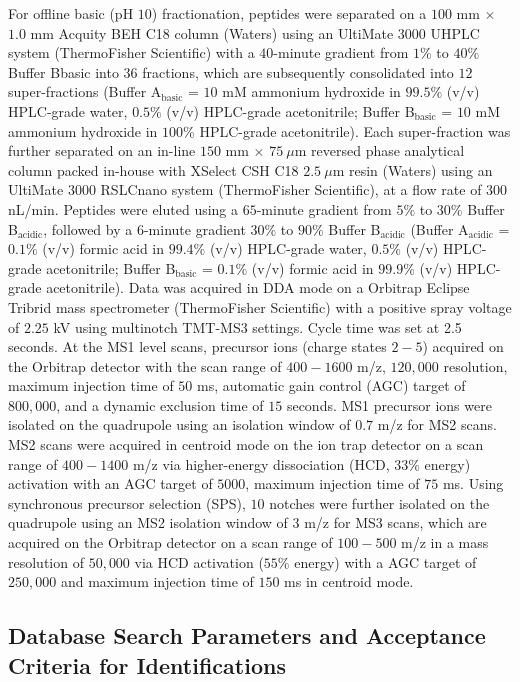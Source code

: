\documentclass[journal=jprobs,manuscript=article]{achemso}
\begin{document}
For offline basic (pH $10$) fractionation, peptides were separated on a $100$ mm $\times$ $1.0$ mm Acquity BEH C18 column (Waters) using an UltiMate $3000$ UHPLC system (ThermoFisher Scientific) with a $40$-minute gradient from $1\%$ to $40\%$ Buffer Bbasic into $36$ fractions, which are subsequently consolidated into $12$ super-fractions (Buffer A$_{\text{basic}}$ = $10$ mM ammonium hydroxide in $99.5\%$ (v/v) HPLC-grade water, $0.5\%$ (v/v) HPLC-grade acetonitrile; Buffer B$_{\text{basic}}$ = $10$ mM ammonium hydroxide in $100\%$ HPLC-grade acetonitrile). Each super-fraction was further separated on an in-line $150$ mm $\times$ $75 \ \mu$m reversed phase analytical column packed in-house with XSelect CSH C18 $2.5\ \mu$m resin (Waters) using an UltiMate $3000$ RSLCnano system (ThermoFisher Scientific), at a flow rate of $300$ nL/min. Peptides were eluted using a $65$-minute gradient from $5\%$ to $30\%$ Buffer B$_{\text{acidic}}$, followed by a $6$-minute gradient $30\%$ to $90\%$ Buffer B$_{\text{acidic}}$ (Buffer A$_{\text{acidic}}$ = $0.1\%$ (v/v) formic acid in $99.4\%$ (v/v) HPLC-grade water, $0.5\%$ (v/v) HPLC-grade acetonitrile; Buffer B$_{\text{basic}}$ = $0.1\%$ (v/v) formic acid in $99.9\%$ (v/v) HPLC-grade acetonitrile). Data was acquired in DDA mode on a Orbitrap Eclipse Tribrid mass spectrometer (ThermoFisher Scientific) with a positive spray voltage of $2.25$ kV using multinotch TMT-MS3 settings\cite{mcalister2014multinotch}. Cycle time was set at 2.5 seconds. At the MS1 level scans, precursor ions (charge states $2-5$) acquired on the Orbitrap detector with the scan range of $400-1600$ m/z, $120{,}000$ resolution, maximum injection time of $50$ ms, automatic gain control (AGC) target of $800{,}000$, and a dynamic exclusion time of $15$ seconds. MS1 precursor ions were isolated on the quadrupole using an isolation window of $0.7$ m/z for MS2 scans. MS2 scans were acquired in centroid mode on the ion trap detector on a scan range of $400-1400$ m/z via higher-energy dissociation (HCD, $33\%$ energy) activation with an AGC target of $5000$, maximum injection time of $75$ ms. Using synchronous precursor selection (SPS)\cite{mcalister2014multinotch}, $10$ notches were further isolated on the quadrupole using an MS2 isolation window of $3$ m/z for MS3 scans, which are acquired on the Orbitrap detector on a scan range of $100-500$ m/z in a mass resolution of $50{,}000$ via HCD activation ($55\%$ energy) with a AGC target of $250{,}000$ and maximum injection time of $150$ ms in centroid mode.

\subsection{Database Search Parameters and Acceptance Criteria for Identifications}
\end{document}
